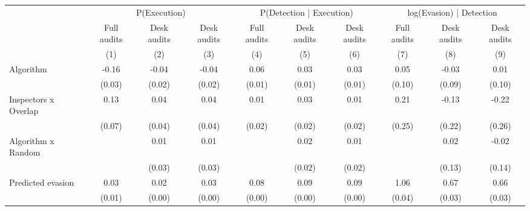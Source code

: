 \begin{tabular}{lccc|ccc|ccc} \toprule
\multicolumn{1}{l}{} & \multicolumn{3}{c}{P(Execution)} & \multicolumn{3}{c}{P(Detection | Execution)} & \multicolumn{3}{c}{log(Evasion) | Detection} \\\cmidrule(lr){2-4}\cmidrule(lr){5-7}\cmidrule(lr){8-10} \multicolumn{1}{l}{} & Full audits & Desk audits & Desk audits & Full audits & Desk audits & Desk audits & Full audits & Desk audits & Desk audits \\ \multicolumn{1}{l}{} & (1) & (2) & (3) & (4) & (5) & (6) & (7) & (8) & (9) \\ \midrule
Algorithm   &       -0.16\sym{***}&       -0.04\sym{**} &       -0.04\sym{**} &        0.06\sym{***}&        0.03\sym{***}&        0.03\sym{***}&        0.05         &       -0.03         &        0.01         \\
            &      (0.03)         &      (0.02)         &      (0.02)         &      (0.01)         &      (0.01)         &      (0.01)         &      (0.10)         &      (0.09)         &      (0.10)         \\
\addlinespace
Inspectors x Overlap&        0.13\sym{*}  &        0.04         &        0.04         &        0.01         &        0.03         &        0.01         &        0.21         &       -0.13         &       -0.22         \\
            &      (0.07)         &      (0.04)         &      (0.04)         &      (0.02)         &      (0.02)         &      (0.02)         &      (0.25)         &      (0.22)         &      (0.26)         \\
\addlinespace
Algorithm x Random&                     &        0.01         &        0.01         &                     &        0.02         &        0.01         &                     &        0.02         &       -0.02         \\
            &                     &      (0.03)         &      (0.03)         &                     &      (0.02)         &      (0.02)         &                     &      (0.13)         &      (0.14)         \\
\addlinespace
Predicted evasion&        0.03\sym{***}&        0.02\sym{***}&        0.03\sym{***}&        0.08\sym{***}&        0.09\sym{***}&        0.09\sym{***}&        1.06\sym{***}&        0.67\sym{***}&        0.66\sym{***}\\
            &      (0.01)         &      (0.00)         &      (0.00)         &      (0.00)         &      (0.00)         &      (0.00)         &      (0.04)         &      (0.03)         &      (0.03)         \\

\end{tabular}
